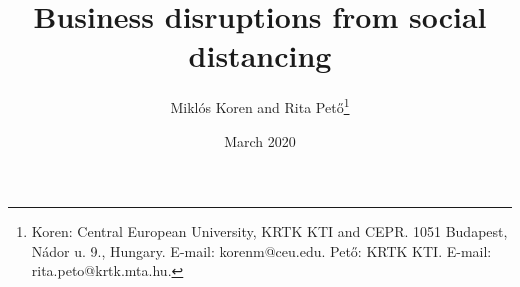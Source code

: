 \documentclass[11pt,a4paper]{article}
\begin{document}
\title{Business disruptions from social distancing}
\author{Miklós Koren and Rita Pető\thanks{Koren: Central European University, KRTK KTI and CEPR. 1051 Budapest, Nádor u. 9., Hungary. E-mail: korenm@ceu.edu. Pető: KRTK KTI. E-mail: rita.peto@krtk.mta.hu.}}

\date{March 2020}
\maketitle

\renewcommand{\baselinestretch}{1.25} \normalsize
\begin{abstract}

\end{abstract}



 
\end{document}
